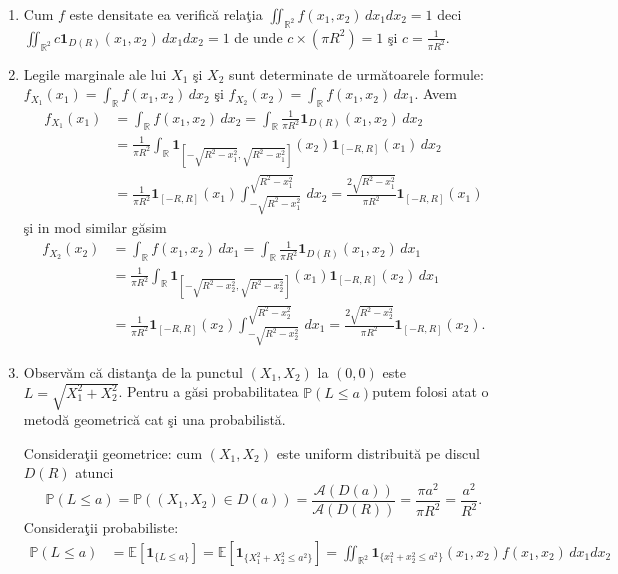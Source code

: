 \documentclass[]{article}
\def\1{{\mathbf 1}}
\def\RR{{\mathbb R}}
\def\PP{{\mathbb P}}
\def\EE{{\mathbb E}}
\def\MA{{\mathcal A}}
\begin{document}
\begin{enumerate}
\item Cum $f$ este densitate ea verific\u a rela\c tia $\iint_{\RR^2}f(x_1,x_2)\,dx_1dx_2 = 1$ deci $\iint_{\RR^2}c\1_{D(R)}(x_1,x_2)\,dx_1dx_2 = 1$ de unde $c\times(\pi R^2) = 1$ \c si $c = \frac{1}{\pi R^2}$.

\item Legile marginale ale lui $X_1$ \c si $X_2$ sunt determinate de urm\u atoarele formule: $f_{X_1}(x_1) = \int_{\RR}f(x_1,x_2)\,dx_2$ \c si $f_{X_2}(x_2) = \int_{\RR}f(x_1,x_2)\,dx_1$. Avem
    \begin{align*}
        f_{X_1}(x_1) &= \int_{\RR}f(x_1,x_2)\,dx_2 = \int_{\RR}\frac{1}{\pi R^2}\1_{D(R)}(x_1,x_2)\,dx_2\\
        &= \frac{1}{\pi R^2}\int_{\RR}\1_{[-\sqrt{R^2-x_1^2},\sqrt{R^2-x_1^2}]}(x_2)\1_{[-R,R]}(x_1)\,dx_2\\
        &= \frac{1}{\pi R^2}\1_{[-R,R]}(x_1)\int_{-\sqrt{R^2-x_1^2}}^{\sqrt{R^2-x_1^2}}\,dx_2 = \frac{2\sqrt{R^2-x_1^2}}{\pi R^2}\1_{[-R,R]}(x_1)
    \end{align*}
\c si in mod similar g\u asim 
    \begin{align*}
        f_{X_2}(x_2) &= \int_{\RR}f(x_1,x_2)\,dx_1 = \int_{\RR}\frac{1}{\pi R^2}\1_{D(R)}(x_1,x_2)\,dx_1\\
        &= \frac{1}{\pi R^2}\int_{\RR}\1_{[-\sqrt{R^2-x_2^2},\sqrt{R^2-x_2^2}]}(x_1)\1_{[-R,R]}(x_2)\,dx_1\\
        &= \frac{1}{\pi R^2}\1_{[-R,R]}(x_2)\int_{-\sqrt{R^2-x_2^2}}^{\sqrt{R^2-x_2^2}}\,dx_1 = \frac{2\sqrt{R^2-x_2^2}}{\pi R^2}\1_{[-R,R]}(x_2).
    \end{align*}
\item Observ\u am c\u a distan\c ta de la punctul $(X_1,X_2)$ la $(0,0)$ este $L = \sqrt{X_1^2+X_2^2}$. Pentru a g\u asi probabilitatea $\PP(L\leq a)$putem folosi atat o metod\u a geometric\u a cat \c si una probabilist\u a.
    \par\noindent
    Considera\c tii geometrice: cum $(X_1,X_2)$ este uniform distribuit\u a pe discul $D(R)$ atunci
    \begin{equation*}
        \PP(L\leq a) = \PP((X_1,X_2)\in D(a)) = \frac{\MA(D(a))}{\MA(D(R))} = \frac{\pi a^2}{\pi R^2} = \frac{a^2}{R^2}.
    \end{equation*}
    Considera\c tii probabiliste:
    \begin{align*}
        \PP(L\leq a) &= \EE\left[\1_{\{L\leq a\}}\right] = \EE\left[\1_{\{X_1^2+X_2^2\leq a^2\}}\right] = \iint_{\RR^2}\1_{\{x_1^2+x_2^2\leq a^2\}}(x_1,x_2)f(x_1,x_2)\,dx_1dx_2\\

\end{align*}
\end{enumerate}
\end{document}
